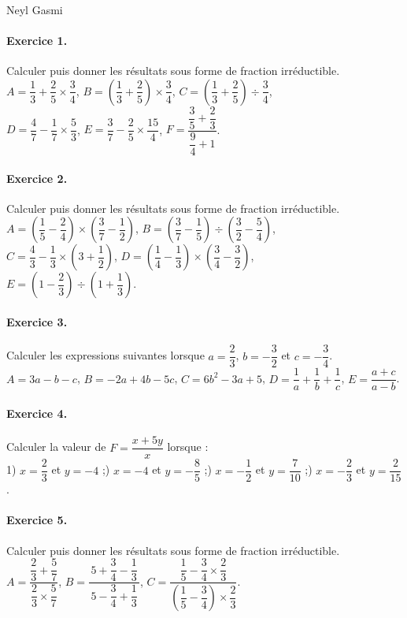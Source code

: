 \documentclass[12pt]{article}
\newenvironment{exercice}[1]{\paragraph{Exercice #1.}}{}
\begin{document}
Neyl Gasmi
\begin{exercice}{1}
Calculer puis donner les résultats sous forme de fraction irréductible.\\
$A=\dfrac{1}{3}+\dfrac{2}{5}\times\dfrac{3}{4}$,\quad
$B=\left(\dfrac{1}{3}+\dfrac{2}{5}\right)\times\dfrac{3}{4}$,\quad
$C=\left(\dfrac{1}{3}+\dfrac{2}{5}\right)\div\dfrac{3}{4}$,\\
$D=\dfrac{4}{7}-\dfrac{1}{7}\times\dfrac{5}{3}$,\quad
$E=\dfrac{3}{7}-\dfrac{2}{5}\times\dfrac{15}{4}$,\quad
$F=\dfrac{\dfrac{3}{5}+\dfrac{2}{3}}{\dfrac{9}{4}+1}$. 
\end{exercice}

\begin{exercice}{2}
Calculer puis donner les résultats sous forme de fraction irréductible.\\
$A=\left(\dfrac{1}{5}-\dfrac{2}{4}\right)\times\left(\dfrac{3}{7}-\dfrac{1}{2}\right)$,\quad
$B=\left(\dfrac{3}{7}-\dfrac{1}{5}\right)\div\left(\dfrac{3}{2}-\dfrac{5}{4}\right)$,\\
$C=\dfrac{4}{3}-\dfrac{1}{3}\times\left(3+\dfrac{1}{2}\right)$,\quad
$D=\left(\dfrac{1}{4}-\dfrac{1}{3}\right)\times\left(\dfrac{3}{4}-\dfrac{3}{2}\right)$,\\
$E=\left(1-\dfrac{2}{3}\right)\div\left(1+\dfrac{1}{3}\right)$.
\end{exercice} 

\begin{exercice}{3}
Calculer les expressions suivantes lorsque $a=\dfrac{2}{3}$, $b=-\dfrac{3}{2}$ et $c=-\dfrac{3}{4}$.\\
$A=3a-b-c$,\quad
$B=-2a+4b-5c$,\quad
$C=6b^{2}-3a+5$,\quad
$D=\dfrac{1}{a}+\dfrac{1}{b}+\dfrac{1}{c}$,\quad
$E=\dfrac{a+c}{a-b}$.
\end{exercice} 

\begin{exercice}{4}
Calculer la valeur de $F=\dfrac{x+5y}{x}$ lorsque :\\
1) $x=\dfrac{2}{3}$ et $y=-4$ ;) $x=-4$ et $y=-\dfrac{8}{5}$ ;) $x=-\dfrac{1}{2}$ et $y=\dfrac{7}{10}$ ;) $x=-\dfrac{2}{3}$ et $y=\dfrac{2}{15}$.
\end{exercice} 

\begin{exercice}{5}
Calculer puis donner les résultats sous forme de fraction irréductible.\\
$A=\dfrac{\dfrac{2}{3}+\dfrac{5}{7}}{\dfrac{2}{3}\times\dfrac{5}{7}}$,\quad
$B=\dfrac{5+\dfrac{3}{4}-\dfrac{1}{3}}{\,5-\dfrac{3}{4}+\dfrac{1}{3}\,}$,\quad
$C=\dfrac{\dfrac{1}{5}-\dfrac{3}{4}\times\dfrac{2}{3}}{\left(\dfrac{1}{5}-\dfrac{3}{4}\right)\times\dfrac{2}{3}}$.
\end{exercice}
\end{document}
